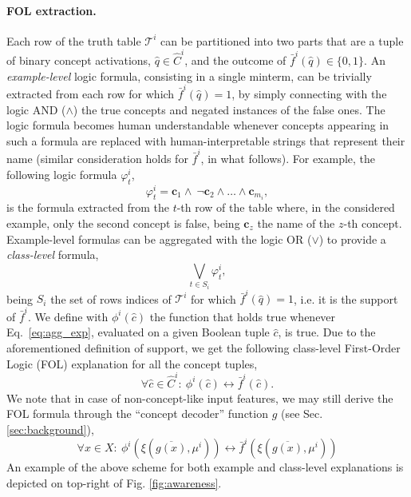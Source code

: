\documentclass[withindex,glossary]{cam-thesis}
\theoremstyle{plain}
\theoremstyle{definition}
\theoremstyle{remark}
\begin{document}
\paragraph{FOL extraction.}
Each row of the truth table $\mathcal{T}^i$ can be partitioned into two parts that are a tuple of binary concept activations, $\hat{q}\in \hat{C}^i$, and the outcome of $\bar{f}^i(\hat{q}) \in \{0, 1\}$. 
An \textit{example-level} logic formula, consisting in a single minterm, can be trivially extracted from each row for which $\bar{f}^i(\hat{q})=1$, by simply connecting with the logic AND ($\wedge$) the true concepts and negated instances of the false ones. 
The logic formula becomes human understandable whenever concepts appearing in such a formula are replaced with human-interpretable strings that represent their name (similar consideration holds for $\bar{f}^i$, in what follows). For example, the following logic formula $\varphi^i_t$,
\begin{equation}
    \varphi^i_{t} = \textbf{c}_1\wedge\ \neg \textbf{c}_2 \wedge \ldots\wedge\textbf{c}_{m_i},
    \label{eq:locexp}
\end{equation}
is the formula extracted from the $t$-th row of the table where, in the considered example, only the second concept is false, being $\textbf{c}_z$ the name of the $z$-th concept.
Example-level formulas can be aggregated with the logic OR ($\vee$) to provide a \textit{class-level} formula, 
\begin{equation}
    \displaystyle\bigvee_{t \in S_i}\varphi^i_t, %
\label{eq:agg_exp}
\end{equation}
being $S_i$ the set of rows
 indices of $\mathcal{T}^i$ for which $\bar{f}^i(\hat{q}) = 1$, i.e. it is the support of $\bar{f}^i$.
We define with $\phi^i(\hat{c})$ the function that holds true whenever Eq.~\ref{eq:agg_exp}, evaluated on a given Boolean tuple $\hat{c}$, is true.
Due to the aforementioned definition of support, we get the following class-level First-Order Logic (FOL) explanation for all the concept tuples,
\begin{equation}
\forall \hat{c} \in \hat{C}^i:\ \phi^i(\hat{c})\leftrightarrow\bar{f}^i(\hat{c}).
\label{eq:FOL_C}
\end{equation}
We note that in case of non-concept-like input features, we may still derive the FOL formula through the ``concept decoder'' function $g$ (see Sec. \ref{sec:background}),
\begin{equation}
\forall x \in X:\ \phi^i\left(\xi(\overline{g(x)},\mu^i)\right)\leftrightarrow\bar{f}^i\left(\xi(\overline{g(x)},\mu^i)\right)
\end{equation}
An example of the above scheme for both example and class-level explanations is depicted on top-right of Fig. \ref{fig:awareness}.
\end{document}
